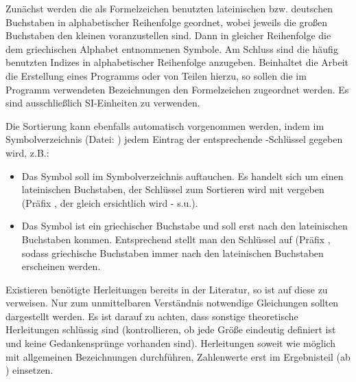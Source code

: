 Zunächst werden die als Formelzeichen benutzten lateinischen bzw. deutschen Buchstaben in alphabetischer Reihenfolge geordnet, wobei
jeweils die großen Buchstaben den kleinen voranzustellen sind. Dann in gleicher
Reihenfolge die dem griechischen Alphabet entnommenen Symbole. Am Schluss
sind die häufig benutzten Indizes in alphabetischer Reihenfolge anzugeben. Beinhaltet
die Arbeit die Erstellung eines Programms oder von Teilen hierzu, so sollen die im
Programm verwendeten Bezeichnungen den Formelzeichen zugeordnet werden. Es
sind ausschließlich SI-Einheiten zu verwenden.

Die Sortierung kann ebenfalls automatisch vorgenommen werden, indem im Symbolverzeichnis (Datei: ) jedem Eintrag der entsprechende 
-Schlüssel gegeben wird, z.B.:
\begin{itemize}
 \item Das Symbol  soll im Symbolverzeichnis auftauchen. Es handelt sich um einen lateinischen Buchstaben, 
       der Schlüssel zum Sortieren wird mit  vergeben (Präfix , der gleich ersichtlich wird - s.u.).
 \item Das Symbol \tb{$\alpha$} ist ein griechischer Buchstabe und soll erst nach den lateinischen Buchstaben kommen. 
       Entsprechend stellt man den Schlüssel auf  (Präfix , sodass griechische Buchstaben immer
       nach den lateinischen Buchstaben erscheinen werden.
\end{itemize}

Existieren benötigte Herleitungen bereits in der Literatur, so ist auf diese zu verweisen. Nur zum unmittelbaren Verständnis notwendige Gleichungen sollten
dargestellt werden. Es ist darauf zu achten, dass sonstige theoretische Herleitungen schlüssig sind (kontrollieren, ob jede Größe eindeutig definiert ist
und keine Gedankensprünge vorhanden sind). Herleitungen soweit wie möglich mit allgemeinen Bezeichnungen durchführen, Zahlenwerte erst im Ergebnisteil (ab 
) einsetzen.